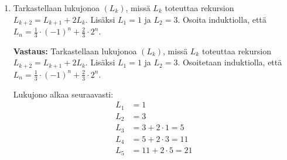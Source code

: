\documentclass[a4paper,12pt]{article}
\begin{document}
\begin{enumerate}
Alkuaskel on siis ok.

\underline{Induktio-oletus:} Oletetaan $k\in \Z$, $k\geq 1$ ja 
\begin{equation*}
    4^k>3k^2. 
\end{equation*} 

\underline{Induktioväite:} Osoitetaan, että väite pätee luvulla $k+1 \in \Z$, eli
\begin{align*}
    4^{k+1}&>3(k+1)^2\\
    &=3(k^2+2k+1)\\
    &=3k^2+6k+3
\end{align*}

\underline{Induktioaskel:} Kertomalla induktio-oletuksen molemmat puolet neljällä saadaan uusi epäyhtälö $4^{k+1}>3k^2+3k^2+3k^2+3k^2$. Arvioidaan tämän epäyhtälön oikeaa puolta alaspäin käyttäen oletusta $k\geq 1$, ja katsotaan saadaanko se muotoon, jossa nähdään sen olevan suurempi kuin induktioväitteen $3k^2+6k+3$:
\begin{align*}
    4^{k+1}&>3k^2+3k^2+3k^2+3k^2 \\
    & = 3k^2 + 3\cdot k \cdot k +3\cdot k \cdot k + 3\cdot k \cdot k \\
    & \geq 3k^2 + 3\cdot 1 \cdot k + 3\cdot 1 \cdot k  + 3\cdot 1 \cdot 1 \\
    & = 3k^2 + 6k +3.
\end{align*}
Saadusta epäyhtälöketjusta voidaan päätellä, että $4^{k+1} > 3k^2 + 6k +3$.

\underline{Johtopäätös:} Alkuaskeleesta ja induktioaskeleesta seuraa induktioperiaatteen nojalla, että kaikilla luonnollisilla luvuilla $n \geq 1$ pätee $4^n>3n^2$. \vspace{1em}

\item Tarkastellaan lukujonoa $(L_k)$, miss\"a $L_k$ toteuttaa rekursion $L_{k+2}=L_{k+1}+2L_k$. Lis\"aksi $L_1=1$ ja $L_2=3$. Osoita induktiolla, ett\"a $L_n=\frac{1}{3}\cdot (-1)^n+\frac{2}{3}\cdot 2^n$. 

\textbf{Vastaus:} Tarkastellaan lukujonoa $(L_k)$, miss\"a $L_k$ toteuttaa rekursion $L_{k+2}=L_{k+1}+2L_k$. Lis\"aksi $L_1=1$ ja $L_2=3$. Osoitetaan induktiolla, ett\"a $L_n=\frac{1}{3}\cdot (-1)^n+\frac{2}{3}\cdot 2^n$. 

Lukujono alkaa seuraavasti:
\begin{align*}
    L_1&=1\\
    L_2&=3\\
    L_3&=3+2\cdot 1=5\\
    L_4&=5+2\cdot 3=11\\
    L_5&=11+2\cdot 5=21
\end{align*}


\end{enumerate}
\end{document}
